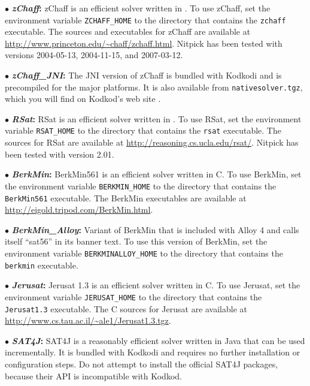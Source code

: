 \documentclass[a4paper,12pt]{article}
\begin{document}
\begin{enum}
\begin{enum}
\item[$\bullet$] \textbf{\textit{zChaff}:} zChaff is an efficient solver written
in \cpp{}. To use zChaff, set the environment variable \texttt{ZCHAFF\_HOME} to
the directory that contains the \texttt{zchaff} executable.%
The \cpp{} sources and executables for zChaff are available at
\url{http://www.princeton.edu/~chaff/zchaff.html}. Nitpick has been tested with
versions 2004-05-13, 2004-11-15, and 2007-03-12.

\item[$\bullet$] \textbf{\textit{zChaff\_JNI}:} The JNI version of zChaff is
bundled with Kodkodi and is precompiled for the major
platforms. It is also available from \texttt{native\-solver.\allowbreak tgz},
which you will find on Kodkod's web site \cite{kodkod-2009}.

\item[$\bullet$] \textbf{\textit{RSat}:} RSat is an efficient solver written in
\cpp{}. To use RSat, set the environment variable \texttt{RSAT\_HOME} to the
directory that contains the \texttt{rsat} executable.%
The \cpp{} sources for RSat are available at
\url{http://reasoning.cs.ucla.edu/rsat/}. Nitpick has been tested with version
2.01.

\item[$\bullet$] \textbf{\textit{BerkMin}:} BerkMin561 is an efficient solver
written in C. To use BerkMin, set the environment variable
\texttt{BERKMIN\_HOME} to the directory that contains the \texttt{BerkMin561}
executable.
The BerkMin executables are available at
\url{http://eigold.tripod.com/BerkMin.html}.

\item[$\bullet$] \textbf{\textit{BerkMin\_Alloy}:} Variant of BerkMin that is
included with Alloy 4 and calls itself ``sat56'' in its banner text. To use this
version of BerkMin, set the environment variable
\texttt{BERKMINALLOY\_HOME} to the directory that contains the \texttt{berkmin}
executable.%

\item[$\bullet$] \textbf{\textit{Jerusat}:} Jerusat 1.3 is an efficient solver
written in C. To use Jerusat, set the environment variable
\texttt{JERUSAT\_HOME} to the directory that contains the \texttt{Jerusat1.3}
executable.%
The C sources for Jerusat are available at
\url{http://www.cs.tau.ac.il/~ale1/Jerusat1.3.tgz}.

\item[$\bullet$] \textbf{\textit{SAT4J}:} SAT4J is a reasonably efficient solver
written in Java that can be used incrementally. It is bundled with Kodkodi and
requires no further installation or configuration steps. Do not attempt to
install the official SAT4J packages, because their API is incompatible with
Kodkod.


\end{enum}
\end{enum}
\end{document}
